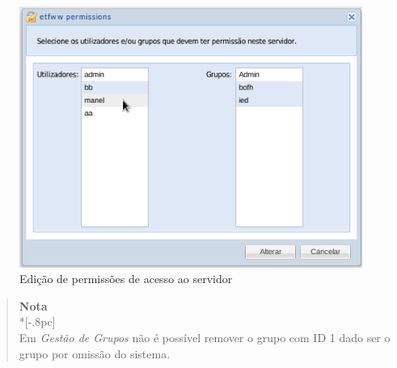 \begin{figure}[H]
        \begin{center}
        \includegraphics[scale=0.4]{screenshots/permissions/server_window.png}
        \caption{Edição de permissões de acesso ao servidor}
        \label{fig:server_window}
        \end{center}
\end{figure}

\begin{quote}
	{\large \bf Nota} \\*[-.8pc]
	\underline{\hspace{6in}} \\    
	Em \emph{Gestão de Grupos} não é possível remover o grupo com ID 1 dado ser o grupo por omissão do sistema.
\end{quote}

\pagebreak
